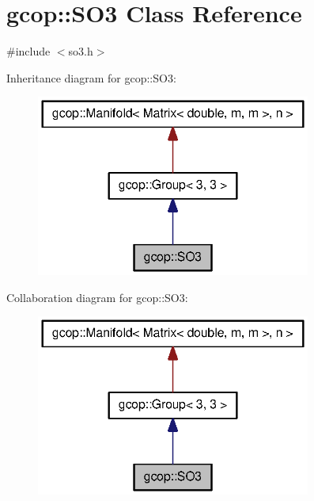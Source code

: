 \section{gcop\-:\-:\-S\-O3 \-Class \-Reference}
\label{classgcop_1_1SO3}


{\ttfamily \#include $<$so3.\-h$>$}



\-Inheritance diagram for gcop\-:\-:\-S\-O3\-:
\nopagebreak
\begin{figure}[H]
\begin{center}
\leavevmode
\includegraphics[width=256pt]{classgcop_1_1SO3__inherit__graph}
\end{center}
\end{figure}


\-Collaboration diagram for gcop\-:\-:\-S\-O3\-:
\nopagebreak
\begin{figure}[H]
\begin{center}
\leavevmode
\includegraphics[width=256pt]{classgcop_1_1SO3__coll__graph}
\end{center}
\end{figure}
